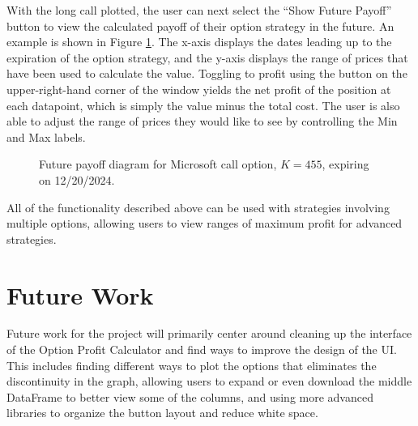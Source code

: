 \documentclass{article}
\begin{document}
\indent With the long call plotted, the user can next select the \enquote{Show Future Payoff} button to view the calculated payoff of their option strategy in the future. An example is shown in Figure \ref{fig:Figure 10}. The x-axis displays the dates leading up to the expiration of the option strategy, and the y-axis displays the range of prices that have been used to calculate the value. Toggling to profit using the button on the upper-right-hand corner of the window yields the net profit of the position at each datapoint, which is simply the value minus the total cost. The user is also able to adjust the range of prices they would like to see by controlling the Min and Max labels. 

\begin{figure}[htbp]
    \centering
    \caption{\label{fig:Figure 10}Future payoff diagram for Microsoft call option, $K=455$, expiring on 12/20/2024.}
\end{figure}

All of the functionality described above can be used with strategies involving multiple options, allowing users to view ranges of maximum profit for advanced strategies. 

\section{Future Work}

\indent Future work for the project will primarily center around cleaning up the interface of the Option Profit Calculator and find ways to improve the design of the UI. This includes finding different ways to plot the options that eliminates the discontinuity in the graph, allowing users to expand or even download the middle DataFrame to better view some of the columns, and using more advanced libraries to organize the button layout and reduce white space. 
\end{document}
